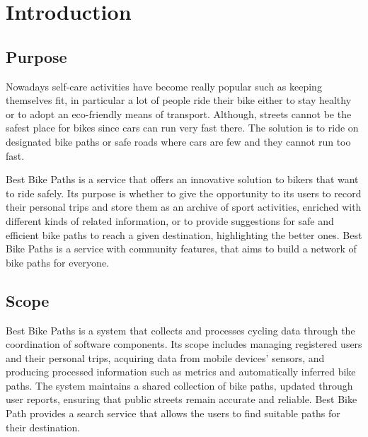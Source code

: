 \documentclass{Configuration_Files/PoliMi3i_thesis}
\begin{document}
\mainmatter %


\chapter{Introduction}

\section{Purpose}
Nowadays self-care activities have become really popular such as keeping themselves fit, in particular a lot of people ride their bike either to stay healthy or to adopt an eco-friendly means of transport. Although, streets cannot be the safest place for bikes since cars can run very fast there. The solution is to ride on designated bike paths or safe roads where cars are few and they cannot run too fast.

Best Bike Paths is a service that offers an innovative solution to bikers that want to ride safely. Its purpose is whether to give the opportunity to its users to record their personal trips and store them as an archive of sport activities, enriched with different kinds of related information, or to provide suggestions for safe and efficient bike paths to reach a given destination, highlighting the better ones. Best Bike Paths is a service with community features, that aims to build a network of bike paths for everyone.
\section{Scope}
Best Bike Paths is a system that collects and processes cycling data through the coordination of software components. Its scope includes managing registered users and their personal trips, acquiring data from mobile devices' sensors, and producing processed information such as metrics and automatically inferred bike paths. The system maintains a shared collection of bike paths, updated through user reports, ensuring that public streets remain accurate and reliable. Best Bike Path provides a search service that allows the users to find suitable paths for their destination.
\end{document}
